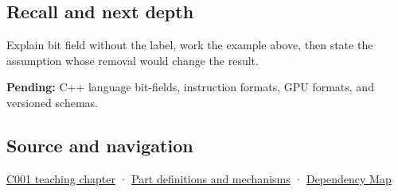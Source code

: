 \subsection{Recall and next depth}\label{appendix-ac697f5c66e8-recall-and-next-depth}

Explain bit field without the label, work the example above, then state the assumption whose removal would change the result.

\textbf{Pending:} C++ language bit-fields, instruction formats, GPU formats, and versioned schemas.

\subsection{Source and navigation}\label{appendix-ac697f5c66e8-source-and-navigation}

\hyperref[01-foundations-i-ch001-from-a-signal-to-an-interpretation]{C001 teaching chapter} · \hyperref[appendix-fd090d982a15]{Part definitions and mechanisms} · \hyperref[appendix-4ad47bdd269a]{Dependency Map}
